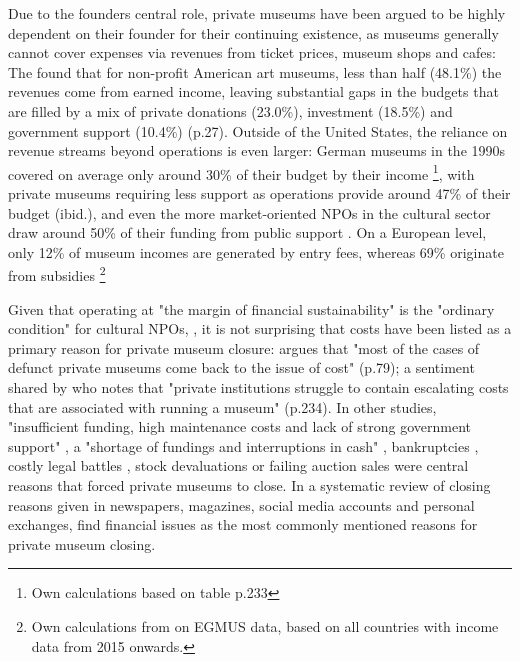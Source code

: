 \documentclass[12pt]{article}
\begin{document}
Due to the founders central role, private museums have been argued to be highly dependent on their founder for their continuing existence, as museums generally cannot cover expenses via revenues from ticket prices, museum shops and cafes:
The \textcite{IMLS_2008_funding} found that for non-profit American art museums, less than half (48.1\%) the revenues come from earned income, leaving substantial gaps in the budgets that are filled by a mix of private donations (23.0\%), investment (18.5\%) and government support (10.4\%) (p.27).
Outside of the United States, the reliance on revenue streams beyond operations is even larger:
German museums in the 1990s covered on average only around 30\% of their budget by their income \parencite{Martin_1993_museen}\footnote{Own calculations based on table p.233}, with private museums requiring less support as operations provide around 47\% of their budget (ibid.), and even the more market-oriented NPOs in the cultural sector draw around 50\% of their funding from public support \parencite[p.82]{Zimmer_Priller_2007_gemeinnuetzig}.
On a European level, only 12\% of museum incomes are generated by entry fees, whereas 69\% originate from subsidies \parencite{EGMUS_2024_complete.}\footnote{Own calculations from on EGMUS data, based on all countries with income data from 2015 onwards.}


Given that operating at "the margin of financial sustainability" is the "ordinary condition" for cultural NPOs, \parencite[p.2]{Licci_BaraldiBonini_2024_sustainability}, it is not surprising that costs have been listed as a primary reason for private museum closure:
\textcite{Adam_2021_rise} argues that "most of the cases of defunct private museums come back to the issue of cost" (p.79); a sentiment shared by \textcite{Walker_2019_collector} who notes that "private institutions struggle to contain escalating costs that are associated with running a museum" (p.234).
In other studies, "insufficient funding, high maintenance costs and lack of strong government support" \parencite[p.7]{Zennaro_2017_shanghai}, a "shortage of fundings and interruptions in cash" \parencite[p.45]{Song_2008_private}, bankruptcies \parencite{Velthuis_Gera_2024_fragility,Liu_2019_identities,DeNigris_2018_museums}, costly legal battles \parencite{Velthuis_Gera_2024_fragility}, stock devaluations \parencite{Walker_2019_collector} or failing auction sales \parencite{Bechtler_Imhof_2018_future} were central reasons that forced private museums to close.
In a systematic review of closing reasons given in newspapers, magazines, social media accounts and personal exchanges, \textcite{Velthuis_Gera_2024_fragility} find financial issues as the most commonly mentioned reasons for private museum closing.
\end{document}
